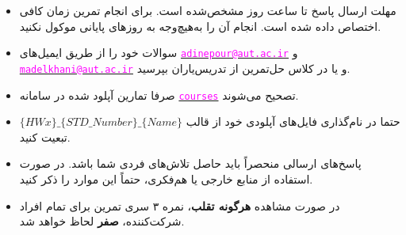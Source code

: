 \begin{itemize}
	\small
	\setlength\itemsep{0.05em}
	\item
	مهلت ارسال پاسخ تا ساعت  روز مشخص‌شده است. ﺑﺮای اﻧﺠﺎم ﺗﻤﺮﯾﻦ زﻣﺎن کافی اختصاص‌ داده ‌شده اﺳﺖ. انجام آن را به‌هیچ‌وجه ﺑﻪ روزﻫﺎی پایانی موکول نکنید.
	\item 
	سوالات خود را از طریق ایمیل‌های \href{mailto:adinepour@aut.ac.ir}{\textcolor{magenta}{\texttt{adinepour@aut.ac.ir}}} و \href{mailto:madelkhani@aut.ac.ir}{\textcolor{magenta} {\texttt{madelkhani@aut.ac.ir}}} و یا در کلاس حل‌تمرین از تدریس‌یاران بپرسید.
	\item 
	صرفا تمارین آپلود شده در سامانه \href{https://courses.aut.ac.ir/}{\textcolor{magenta}{\texttt{courses}}} تصحیح می‌شوند.
	
	\item 
	حتما در نام‌گذاری فایل‌های آپلودی خود از قالب
	 $\{HWx\}\_\{STD\_Number\}\_\{Name\}$ 
	 تبعیت کنید.
	
	
	\item
	پاسخ‌های ارسالی منحصراً باید حاصل تلاش‌های فردی شما باشد. در صورت استفاده از منابع خارجی یا هم‌فکری، حتماً این موارد را ذکر کنید.
	
	\item 
	در صورت مشاهده \textbf{هرگونه تقلب}، نمره ۳ سری تمرین برای تمام افراد شرکت‌کننده، \textbf{صفر} لحاظ خواهد شد.
\end{itemize}

